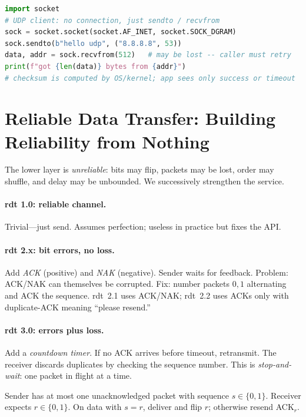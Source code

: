 \begin{lstlisting}[language=Python]
import socket
# UDP client: no connection, just sendto / recvfrom
sock = socket.socket(socket.AF_INET, socket.SOCK_DGRAM)
sock.sendto(b"hello udp", ("8.8.8.8", 53))
data, addr = sock.recvfrom(512)   # may be lost -- caller must retry
print(f"got {len(data)} bytes from {addr}")
# checksum is computed by OS/kernel; app sees only success or timeout
\end{lstlisting}

\section{Reliable Data Transfer: Building Reliability from Nothing}
\label{sec:rdt}
The lower layer is \emph{unreliable}: bits may flip, packets may be lost, order may shuffle, and delay may be unbounded. We successively strengthen the service.

\paragraph{rdt 1.0: reliable channel.} Trivial---just send. Assumes perfection; useless in practice but fixes the API.

\paragraph{rdt 2.x: bit errors, no loss.} Add \emph{ACK} (positive) and \emph{NAK} (negative). Sender waits for feedback. Problem: ACK/NAK can themselves be corrupted. Fix: number packets $0,1$ alternating and ACK the sequence. rdt~2.1 uses ACK/NAK; rdt~2.2 uses ACKs only with duplicate-ACK meaning ``please resend.''

\paragraph{rdt 3.0: errors plus loss.} Add a \emph{countdown timer}. If no ACK arrives before timeout, retransmit. The receiver discards duplicates by checking the sequence number. This is \emph{stop-and-wait}: one packet in flight at a time.

\begin{definition}
Sender has at most one unacknowledged packet with sequence $s\in\{0,1\}$. Receiver expects $r\in\{0,1\}$. On data with $s=r$, deliver and flip $r$; otherwise resend ACK$_r$.
\end{definition}

